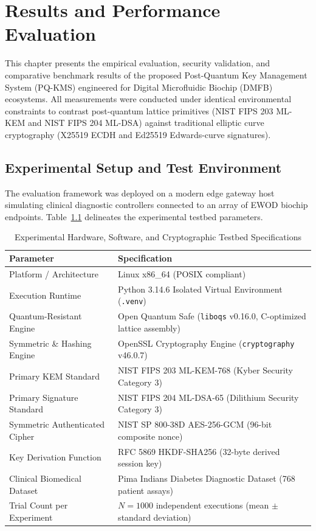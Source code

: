 \chapter{Results and Performance Evaluation}
\label{chap:results}

This chapter presents the empirical evaluation, security validation, and comparative benchmark results of the proposed Post-Quantum Key Management System (PQ-KMS) engineered for Digital Microfluidic Biochip (DMFB) ecosystems. All measurements were conducted under identical environmental constraints to contrast post-quantum lattice primitives (NIST FIPS 203 ML-KEM and NIST FIPS 204 ML-DSA) against traditional elliptic curve cryptography (X25519 ECDH and Ed25519 Edwards-curve signatures).

\section{Experimental Setup and Test Environment}
The evaluation framework was deployed on a modern edge gateway host simulating clinical diagnostic controllers connected to an array of EWOD biochip endpoints. Table~\ref{tab:env_specs} delineates the experimental testbed parameters.

\begin{table}[htbp]
\centering
\caption{Experimental Hardware, Software, and Cryptographic Testbed Specifications}
\label{tab:env_specs}
\begin{tabular}{ll}
\hline
\textbf{Parameter} & \textbf{Specification} \\
\hline
Platform / Architecture & Linux x86\_64 (POSIX compliant) \\
Execution Runtime & Python 3.14.6 Isolated Virtual Environment (\texttt{.venv}) \\
Quantum-Resistant Engine & Open Quantum Safe (\texttt{liboqs} v0.16.0, C-optimized lattice assembly) \\
Symmetric \& Hashing Engine & OpenSSL Cryptography Engine (\texttt{cryptography} v46.0.7) \\
Primary KEM Standard & NIST FIPS 203 ML-KEM-768 (Kyber Security Category 3) \\
Primary Signature Standard & NIST FIPS 204 ML-DSA-65 (Dilithium Security Category 3) \\
Symmetric Authenticated Cipher & NIST SP 800-38D AES-256-GCM (96-bit composite nonce) \\
Key Derivation Function & RFC 5869 HKDF-SHA256 (32-byte derived session key) \\
Clinical Biomedical Dataset & Pima Indians Diabetes Diagnostic Dataset (768 patient assays) \\
Trial Count per Experiment & $N = 1000$ independent executions (mean $\pm$ standard deviation) \\
\hline
\end{tabular}
\end{table}

